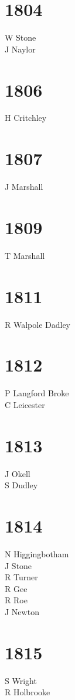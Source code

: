 \begin{multicols}{2}
  \section*{1804}
  W Stone \\
  J Naylor \\
  \section*{1806}
  H Critchley \\
  \section*{1807}
  J Marshall \\
  \section*{1809}
  T Marshall \\
  \section*{1811}
  R Walpole Dadley \\
  \section*{1812}
  P Langford Broke \\
  C Leicester \\
  \section*{1813}
  J Okell \\
  S Dudley \\
  \section*{1814}
  N Higgingbotham \\
  J Stone \\
  R Turner \\
  R Gee \\
  R Roe \\
  J Newton \\
  \section*{1815}
  S Wright \\
  R Holbrooke \\

\end{multicols}
